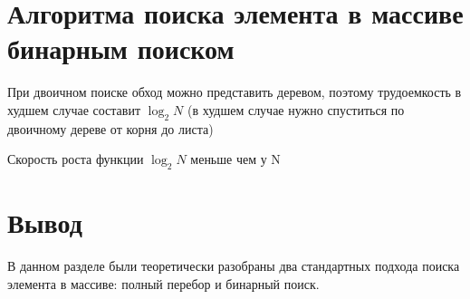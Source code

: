 \section{Алгоритма поиска элемента в массиве бинарным поиском}
При двоичном поиске обход можно представить деревом, поэтому трудоемкость в худшем случае составит $\log_2 N$ (в худшем случае нужно спуститься по двоичному дереве от корня до листа)

Скорость роста функции $\log_2 N$ меньше чем у N


\section*{Вывод}
В данном разделе были теоретически разобраны два стандартных подхода поиска элемента в массиве: полный перебор и бинарный поиск.


\clearpage
